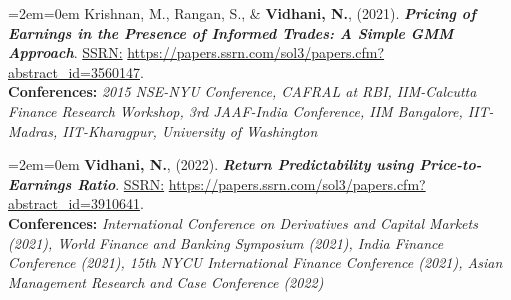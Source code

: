 \documentclass[11pt,a4paper,]{moderncv}
\begin{document}
%
  \par%
  \medskip
  \leftskip=2em\rightskip=0em%
  \noindent\ignorespaces
Krishnan, M., Rangan, S., \& \textbf{Vidhani, N.}, (2021). \textbf{\textit{Pricing of Earnings in the Presence of Informed Trades: A Simple GMM Approach}}. \underline{SSRN:} \url{https://papers.ssrn.com/sol3/papers.cfm?abstract_id=3560147}.\\
\textbf{Conferences:} \textit{2015 NSE-NYU Conference, CAFRAL at RBI, IIM-Calcutta Finance Research Workshop, 3rd JAAF-India Conference, IIM Bangalore, IIT-Madras, IIT-Kharagpur, University of Washington}\\
%
  \par\medskip

%
  \par%
  \medskip
  \leftskip=2em\rightskip=0em%
  \noindent\ignorespaces
\textbf{Vidhani, N.}, (2022). \textbf{\textit{Return Predictability using
Price-to-Earnings Ratio}}. \underline{SSRN:} \url{https://papers.ssrn.com/sol3/papers.cfm?abstract_id=3910641}.\\
\textbf{Conferences:} \textit{International Conference on Derivatives and Capital Markets (2021), World Finance and Banking Symposium (2021), India Finance Conference (2021), 15th NYCU International Finance Conference (2021), Asian Management Research and Case Conference (2022)}\\
%
  \par\medskip

\endgroup
\end{document}
